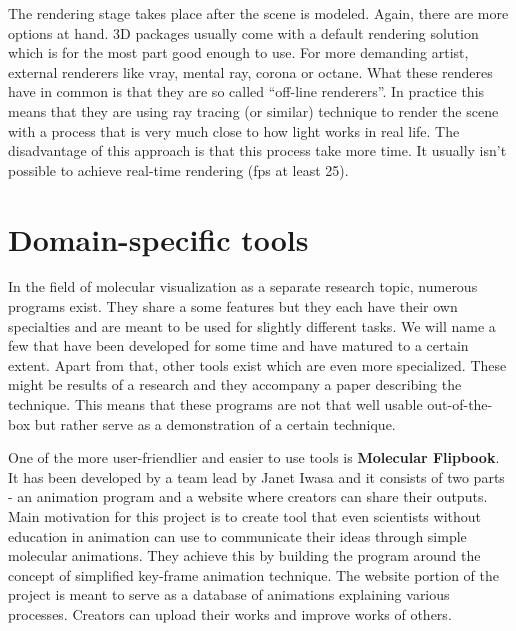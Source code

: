 \documentclass[
  digital, %
  table,   %
  nolof,     %
  nolot,     %
]{fithesis3}
\begin{document}

The rendering stage takes place after the scene is modeled. Again, there are more options at hand. 3D packages usually come with a default rendering solution which is for the most part good enough to use. For more demanding artist, external renderers like vray, mental ray, corona or octane. What these renderes have in common is that they are so called ``off-line renderers''. In practice this means that they are using ray tracing (or similar) technique to render the scene with a process that is very much close to how light works in real life. The disadvantage of this approach is that this process take more time. It usually isn't possible to achieve real-time rendering (fps at least 25).

\section{Domain-specific tools}
In the field of molecular visualization as a separate research topic, numerous programs exist. They share a some features but they each have their own specialties and are meant to be used for slightly different tasks. We will name a few that have been developed for some time and have matured to a certain extent. Apart from that, other tools exist which are even more specialized. These might be results of a research and they accompany a paper describing the technique. This means that these programs are not that well usable out-of-the-box but rather serve as a demonstration of a certain technique.

One of the more user-friendlier and easier to use tools is \textbf{Molecular Flipbook}. It has been developed by a team lead by Janet Iwasa and it consists of two parts - an animation program and a website where creators can share their outputs. Main motivation for this project is to create tool that even scientists without education in animation can use to communicate their ideas through simple molecular animations. They achieve this by building the program around the concept of simplified key-frame animation technique. The website portion of the project is meant to serve as a database of animations explaining various processes. Creators can upload their works and improve works of others.
\end{document}
